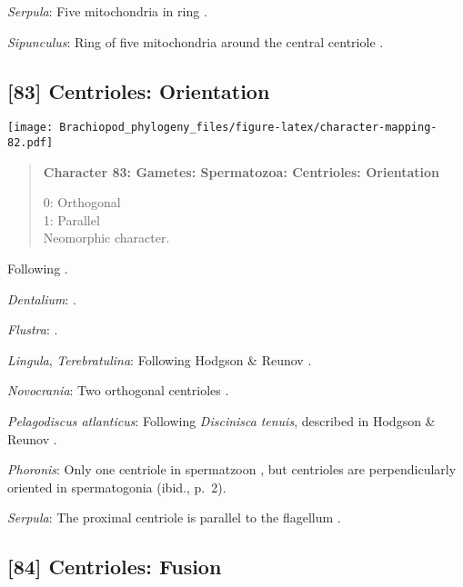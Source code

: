 \documentclass[openany]{book}
\theoremstyle{definition}
\theoremstyle{definition}
\theoremstyle{definition}
\theoremstyle{remark}
\begin{document}
\hypertarget{Serpula-coding-82}{}
\emph{Serpula}: Five mitochondria in ring \citep{Gherardi2011}.

\hypertarget{Sipunculus-coding-82}{}
\emph{Sipunculus}: Ring of five mitochondria around the central
centriole \citep{Rice1993}.

\subsection*{{[}83{]} Centrioles:
Orientation}\label{centrioles-orientation}

\texttt{[image: Brachiopod\_phylogeny\_files/figure-latex/character-mapping-82.pdf]}

\begin{quote}
\textbf{Character 83: Gametes: Spermatozoa: Centrioles: Orientation}

0: Orthogonal\\
1: Parallel\\
Neomorphic character.
\end{quote}

Following \citet{Hodgson1994Ultrastructureof}.

\hypertarget{Dentalium-coding-83}{}
\emph{Dentalium}: \citet{DufresneDube1983}.

\hypertarget{Flustra-coding-83}{}
\emph{Flustra}: \citep{Franzen1981}.

\hypertarget{Lingula-coding-83}{}
\emph{Lingula}, \emph{Terebratulina}: Following Hodgson \& Reunov
\citeyearpar{Hodgson1994Ultrastructureof}.

\hypertarget{Novocrania-coding-83}{}
\emph{Novocrania}: Two orthogonal centrioles
\citep{Afzelius1978Finestructure}.

\hypertarget{Pelagodiscus_atlanticus-coding-83}{}
\emph{Pelagodiscus atlanticus}: Following \emph{Discinisca}
\emph{tenuis}, described in Hodgson \& Reunov
\citeyearpar{Hodgson1994Ultrastructureof}.

\hypertarget{Phoronis-coding-83}{}
\emph{Phoronis}: Only one centriole in spermatzoon
\citep[p.~7]{Reunov2004Ultrastructuralstudy}, but centrioles are
perpendicularly oriented in spermatogonia (ibid., p.~2).

\hypertarget{Serpula-coding-83}{}
\emph{Serpula}: The proximal centriole is parallel to the flagellum
\citep{Gherardi2011}.

\subsection*{{[}84{]} Centrioles: Fusion}\label{centrioles-fusion}
\end{document}
